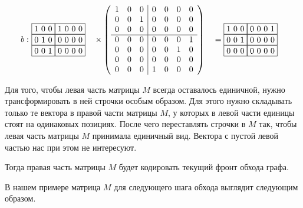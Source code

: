 \begin{example}
\begin{alignat*}{7}
  b:\,\,
  & \begin{matrix}
    \fbox{1 0 0} \fbox{1 0 0 0} \\ 
    \fbox{0 1 0} \fbox{0 0 0 0} \\
    \fbox{0 0 1} \fbox{0 0 0 0}
      \end{matrix}  &&
      \times
      \left(\begin{array}{c c c | c c c c}
      1 & 0 & 0 & 0 & 0 & 0 & 0 \\
      0 & 0 & 1 & 0 & 0 & 0 & 0 \\
      0 & 0 & 0 & 0 & 0 & 0 & 0 \\
      \hline
      0 & 0 & 0 & 0 & 0 & 0 & 1 \\
      0 & 0 & 0 & 0 & 0 & 1 & 0 \\
      0 & 0 & 0 & 0 & 0 & 0 & 0 \\
      0 & 0 & 0 & 1 & 0 & 0 & 0 
      \end{array}\right)
      &&= \begin{matrix}
        \fbox{1 0 0} \fbox{0 0 0 1} \\ 
        \fbox{0 0 1} \fbox{0 0 0 0} \\
        \fbox{0 0 0} \fbox{0 0 0 0}
    \end{matrix}
\end{alignat*}

Для того, чтобы левая часть матрицы $M$ всегда оставалось единичной, нужно трансформировать в ней строчки особым образом.
Для этого нужно складывать только те вектора в правой части матрицы $M$, у которых в левой части единицы стоят на одинаковых позициях.
После чего переставлять строчки в $M$ так, чтобы левая часть матрицы $M$ принимала единичный вид.
Вектора с пустой левой частью нас при этом не интересуют.

Тогда правая часть матрицы $M$ будет кодировать текущий фронт обхода графа.

В нашем примере матрица $M$ для следующего шага обхода выглядит следующим образом.


\end{example}
